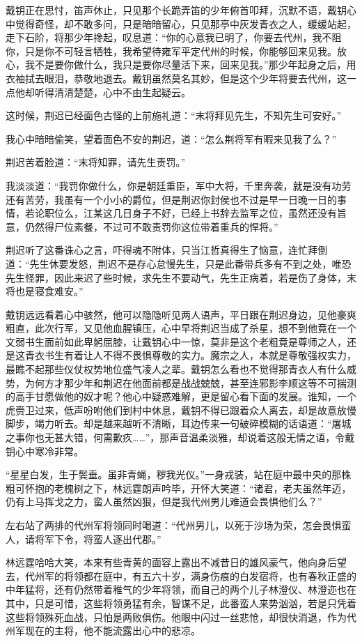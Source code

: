 戴钥正在思忖，笛声休止，只见那个长跪弄笛的少年俯首叩拜，沉默不语，戴钥心中觉得奇怪，却不敢多问，只是暗暗留心，只见那亭中灰发青衣之人，缓缓站起，走下石阶，将那少年搀起，叹息道：“你的心意我已明了，你要去代州，我不阻你，只是你不可轻言牺牲，我希望待雍军平定代州的时候，你能够回来见我。放心，我不是要你做什么，我只是要你尽量活下来，回来见我。”那少年起身之后，用衣袖拭去眼泪，恭敬地退去。戴钥虽然莫名其妙，但是这个少年将要去代州，这一点他却听得清清楚楚，心中不由生起疑云。

这时候，荆迟已经面色古怪的上前施礼道：“末将拜见先生，不知先生可安好。”

我心中暗暗偷笑，望着面色不安的荆迟，道：“怎么荆将军有暇来见我了么？”

荆迟苦着脸道：“末将知罪，请先生责罚。”

我淡淡道：“我罚你做什么，你是朝廷重臣，军中大将，千里奔袭，就是没有功劳还有苦劳，我虽有一个小小的爵位，但是荆迟你封侯也不过是早一日晚一日的事情，若论职位么，江某这几日身子不好，已经上书辞去监军之位，虽然还没有旨意，仍然得尸位素餐，不过可不敢责罚你这位带着重兵的悍将。”

荆迟听了这番诛心之言，吓得魂不附体，只当江哲真得生了恼意，连忙拜倒道：“先生休要发怒，荆迟不是存心怠慢先生，只是此番带兵多有不到之处，唯恐先生怪罪，因此来迟了些时候，求先生不要动气，先生正病着，若是伤了身体，末将也是寝食难安。”

戴钥远远看着心中骇然，他可以隐隐听见两人语声，平日跟在荆迟身边，见他豪爽粗直，此次行军，又见他血腥镇压，心中早将荆迟当成了杀星，想不到他竟在一个文弱书生面前如此卑躬屈膝，让戴钥心中一惊，莫非是这个老粗竟是尊师之人，还是这青衣书生有着让人不得不畏惧尊敬的实力。魔宗之人，本就是尊敬强权实力，最瞧不起那些仪仗权势地位盛气凌人之辈。戴钥怎么看也不觉得那青衣人有什么威势，为何方才那少年和荆迟在他面前都是战战兢兢，甚至连邪影李顺这等不可揣测的高手甘愿做他的奴才呢？他心中疑惑难解，更是留心看下面的发展。谁知，一个虎赍卫过来，低声吩咐他们到村中休息，戴钥不得已跟着众人离去，却是故意放慢脚步，竭力听去。却是越来越听不清晰，耳边传来一句破碎模糊的话语道：“屠城之事你也无甚大错，何需歉疚……”，那声音温柔淡雅，却说着这般无情之语，令戴钥心中寒冷非常。

“星星白发，生于鬓垂。虽非青蝇，秽我光仪。”一身戎装，站在庭中最中央的那株粗可怀抱的老槐树之下，林远霆朗声吟毕，开怀大笑道：“诸君，老夫虽然年迈，仍有上马挥戈之力，蛮人虽然凶狠，但是我代州男儿难道会畏惧他们么？”

左右站了两排的代州军将领同时喝道：“代州男儿，以死于沙场为荣，怎会畏惧蛮人，请将军下令，将蛮人逐出代郡。”

林远霆哈哈大笑，本来有些青黄的面容上露出不减昔日的雄风豪气，他向身后望去，代州军的将领都在庭中，有五六十岁，满身伤痕的白发宿将，也有春秋正盛的中年猛将，还有仍然带着稚气的少年将领，而自己的两个儿子林澄仪、林澄迩也在其中，只是可惜，这些将领勇猛有余，智谋不足，此番蛮人来势汹汹，若是只凭着这些将领殊死血战，只怕是两败俱伤。他眼中闪过一丝悲怆，却很快消退，作为代州军现在的主将，他不能流露出心中的悲凉。

